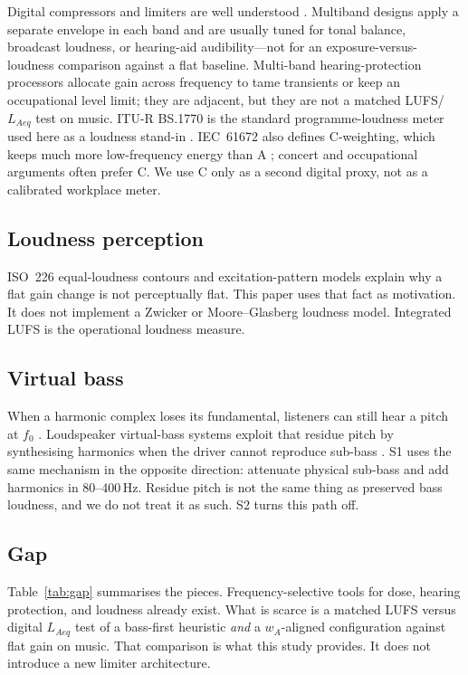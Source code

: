 \documentclass[12pt,journal,onecolumn]{IEEEtran}
\begin{document}
Digital compressors and limiters are well understood \cite{Giannoulis2012,Kates2008}. Multiband designs apply a separate envelope in each band and are usually tuned for tonal balance, broadcast loudness, or hearing-aid audibility---not for an exposure-versus-loudness comparison against a flat baseline. Multi-band hearing-protection processors \cite{Fathima2026,US11006215} allocate gain across frequency to tame transients or keep an occupational level limit; they are adjacent, but they are not a matched LUFS/$L_{Aeq}$ test on music. ITU-R BS.1770 is the standard programme-loudness meter used here as a loudness stand-in \cite{BS1770}. IEC~61672 also defines C-weighting, which keeps much more low-frequency energy than A \cite{IEC61672}; concert and occupational arguments often prefer C. We use C only as a second digital proxy, not as a calibrated workplace meter.

\subsection{Loudness perception}

ISO~226 equal-loudness contours \cite{ISO226} and excitation-pattern models \cite{Zwicker1961,ZwickerFastl1999,MooreGlasbergBaer1997,GlasbergMoore2002} explain why a flat gain change is not perceptually flat. This paper uses that fact as motivation. It does not implement a Zwicker or Moore--Glasberg loudness model. Integrated LUFS is the operational loudness measure.

\subsection{Virtual bass}

When a harmonic complex loses its fundamental, listeners can still hear a pitch at $f_0$ \cite{Schouten1940,Terhardt1974,Terhardt1979}. Loudspeaker virtual-bass systems exploit that residue pitch by synthesising harmonics when the driver cannot reproduce sub-bass \cite{BenTzur1999,Gan2001,Gan2004}. S1 uses the same mechanism in the opposite direction: attenuate physical sub-bass and add harmonics in 80--400\,Hz. Residue pitch is not the same thing as preserved bass loudness, and we do not treat it as such. S2 turns this path off.

\subsection{Gap}

Table~\ref{tab:gap} summarises the pieces. Frequency-selective tools for dose, hearing protection, and loudness already exist. What is scarce is a matched LUFS versus digital $L_{Aeq}$ test of a bass-first heuristic \emph{and} a $w_A$-aligned configuration against flat gain on music. That comparison is what this study provides. It does not introduce a new limiter architecture.
\end{document}
